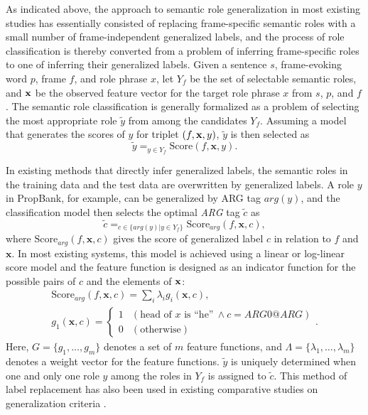 \documentclass[english]{jnlp_1.4_rep}
\newcommand{\argmax}{}
\begin{document}
As indicated above, the approach to semantic role generalization in most existing studies has essentially consisted of replacing frame-specific semantic roles with a small number of frame-independent generalized labels, and the process of role classification is thereby converted from a problem of inferring frame-specific roles to one of inferring their generalized labels. Given a sentence $s$, frame-evoking word $p$, frame $f$, and role phrase $x$, let $Y_f$ be the set of selectable semantic roles, and ${\bf x}$ be the observed feature vector for the target role phrase $x$ from $s$, $p$, and $f$. The semantic role classification is generally formalized as a problem of selecting the most appropriate role $\tilde{y}$ from among the candidates $Y_f$. Assuming a model that generates the scores of $y$ for triplet $(f,{\bf x},y)$, $\tilde{y}$ is then selected as
\begin{equation}
 \tilde{y} = \argmax_{y \in Y_f} \mathrm{Score}(f,\mathbf{x},y).
\label{equ:frame-specific-class}
\end{equation}

In existing methods that directly infer generalized labels, the semantic roles in the training data and the test data are overwritten by generalized labels. A role $y$ in PropBank, for example, can be generalized by ARG tag $arg(y)$, and the classification model then selects the optimal {\it ARG} tag $\tilde{c}$ as
\vspace{-0.5\Cvs}
\begin{equation}
\tilde{c} = \argmax_{c \in \{\mathit{arg}(y)|y \in Y_f\}} \mathrm{Score}_\mathit{arg}(f,\mathbf{x},c),
\end{equation}
where $\mathrm{Score}_\mathit{arg}(f,\mathbf{x},c)$ gives the score of generalized label $c$ in relation to $f$ and $\mathbf{x}$. In most existing systems, this model is achieved using a linear or log-linear score model and the feature function is designed as an indicator function for the possible pairs of $c$ and the elements of ${\bf x}$:
\begin{gather}
 \mathrm{Score}_\mathit{arg}(f,\mathbf{x},c) = \sum_{i}\lambda_{i}g_i(\mathbf{x},c),\\
 g_1(\mathbf{x},c) =  \begin{cases}
   1 & (\mbox{head of }x\mbox{ is ``he''}~\wedge c = \mathit{ARG0@ARG})\\
   0 & (\mbox{otherwise})
  \end{cases}.
\end{gather}
Here, $G=\{g_1,\ldots,g_m\}$ denotes a set of $m$ feature functions, and $\Lambda=\{\lambda_1,\ldots ,\lambda_m\}$ denotes a weight vector for the feature functions. $\tilde{y}$ is uniquely determined when one and only one role $y$ among the roles in $Y_f$ is assigned to $\tilde{c}$. This method of label replacement has also been used in existing comparative studies on generalization criteria \cite{loper2007clr,yi-loper-palmer:2007:main,zapirain-agirre-marquez:2008:ACLMain}.
\end{document}
